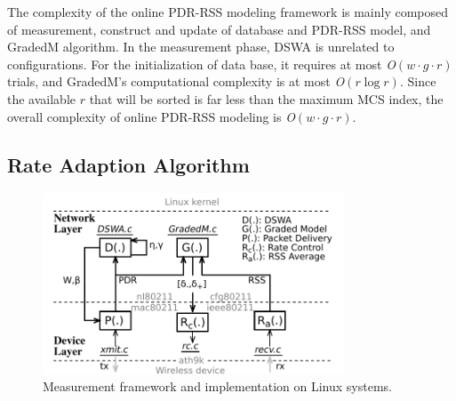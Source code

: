 \documentclass[draftclsnofoot,journal,onecolumn,11pt]{IEEEtran}
\begin{document}
The complexity of the online PDR-RSS modeling framework is mainly composed of measurement, construct and update of database and PDR-RSS model, and GradedM algorithm. In the measurement phase, DSWA is unrelated to configurations. For the initialization of data base, it requires at most \textit{O}$(w\cdot g \cdot r)$ trials, and GradedM's computational complexity is at most \textit{O}$(r \log{r})$. Since the available $r$ that will be sorted is far less than the maximum MCS index, the overall complexity of online PDR-RSS modeling is \textit{O}$(w\cdot g \cdot r)$.


\subsection{Rate Adaption Algorithm}

\begin{figure}[!t]
\centering
\includegraphics[width=0.8\textwidth]{framework.pdf}
\caption{Measurement framework and implementation on Linux systems.}
\label{framework}
\end{figure}
\end{document}
